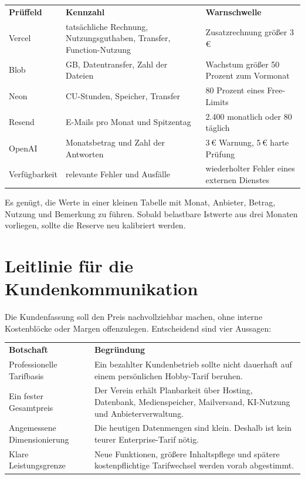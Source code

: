 \documentclass[11pt,a4paper]{article}
\newcommand{\eur}[1]{#1\,€}
\begin{document}
\begin{tabularx}{\textwidth}{L{37mm}Y L{38mm}}
  \toprule
  \color{white}\sffamily\bfseries Prüffeld &
  \color{white}\sffamily\bfseries Kennzahl &
  \color{white}\sffamily\bfseries Warnschwelle \\
  Vercel & tatsächliche Rechnung, Nutzungsguthaben, Transfer, Function-Nutzung & Zusatzrechnung größer \eur{3} \\
  Blob & GB, Datentransfer, Zahl der Dateien & Wachstum größer 50 Prozent zum Vormonat \\
  Neon & CU-Stunden, Speicher, Transfer & 80 Prozent eines Free-Limits \\
  Resend & E-Mails pro Monat und Spitzentag & 2.400 monatlich oder 80 täglich \\
  OpenAI & Monatsbetrag und Zahl der Antworten & \eur{3} Warnung, \eur{5} harte Prüfung \\
  Verfügbarkeit & relevante Fehler und Ausfälle & wiederholter Fehler eines externen Dienstes \\
  \bottomrule
\end{tabularx}

Es genügt, die Werte in einer kleinen Tabelle mit Monat, Anbieter, Betrag, Nutzung und Bemerkung zu führen. Sobald belastbare Istwerte aus drei Monaten vorliegen, sollte die Reserve neu kalibriert werden.

\section{Leitlinie für die Kundenkommunikation}

Die Kundenfassung soll den Preis nachvollziehbar machen, ohne interne Kostenblöcke oder Margen offenzulegen. Entscheidend sind vier Aussagen:

\begin{tabularx}{\textwidth}{L{36mm}Y}
  \toprule
  \color{white}\sffamily\bfseries Botschaft &
  \color{white}\sffamily\bfseries Begründung \\
  Professionelle Tarifbasis & Ein bezahlter Kundenbetrieb sollte nicht dauerhaft auf einem persönlichen Hobby-Tarif beruhen. \\
  Ein fester Gesamtpreis & Der Verein erhält Planbarkeit über Hosting, Datenbank, Medienspeicher, Mailversand, KI-Nutzung und Anbieterverwaltung. \\
  Angemessene Dimensionierung & Die heutigen Datenmengen sind klein. Deshalb ist kein teurer Enterprise-Tarif nötig. \\
  Klare Leistungsgrenze & Neue Funktionen, größere Inhaltspflege und spätere kostenpflichtige Tarifwechsel werden vorab abgestimmt. \\
  \bottomrule
\end{tabularx}
\end{document}

